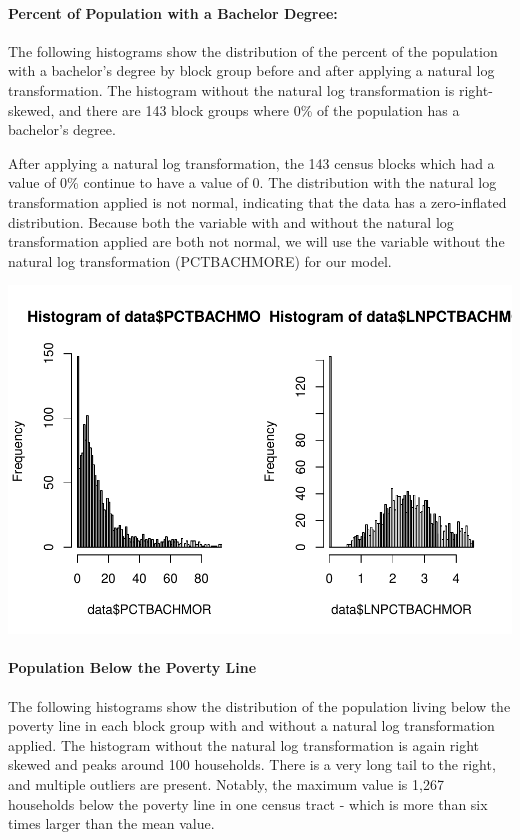 \documentclass[
]{article}
\begin{document}
\hypertarget{percent-of-population-with-a-bachelor-degree}{%
\paragraph{Percent of Population with a Bachelor
Degree:}\label{percent-of-population-with-a-bachelor-degree}}

The following histograms show the distribution of the percent of the
population with a bachelor's degree by block group before and after
applying a natural log transformation. The histogram without the natural
log transformation is right-skewed, and there are 143 block groups where
0\% of the population has a bachelor's degree.

After applying a natural log transformation, the 143 census blocks which
had a value of 0\% continue to have a value of 0. The distribution with
the natural log transformation applied is not normal, indicating that
the data has a zero-inflated distribution. Because both the variable
with and without the natural log transformation applied are both not
normal, we will use the variable without the natural log transformation
(PCTBACHMORE) for our model.

\includegraphics{HW1-Regression_files/figure-latex/hist_PCTBACHMOR-1.pdf}

\hypertarget{population-below-the-poverty-line}{%
\paragraph{Population Below the Poverty
Line}\label{population-below-the-poverty-line}}

The following histograms show the distribution of the population living
below the poverty line in each block group with and without a natural
log transformation applied. The histogram without the natural log
transformation is again right skewed and peaks around 100 households.
There is a very long tail to the right, and multiple outliers are
present. Notably, the maximum value is 1,267 households below the
poverty line in one census tract - which is more than six times larger
than the mean value.
\end{document}
